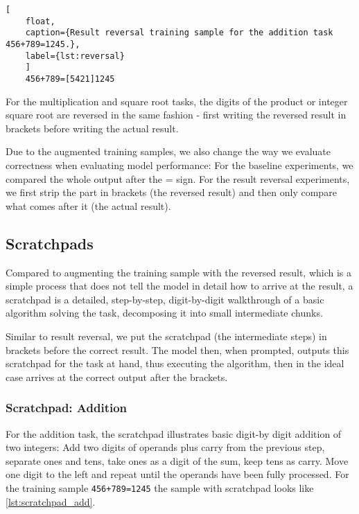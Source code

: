 \begin{lstlisting}[
	float,
	caption={Result reversal training sample for the addition task 456+789=1245.},
	label={lst:reversal}
	]
	456+789=[5421]1245
\end{lstlisting}

For the multiplication and square root tasks, the digits of the product or integer square root are reversed in the same fashion - first writing the reversed result in brackets before writing the actual result.

\noindent
Due to the augmented training samples, we also change the way we evaluate correctness when evaluating model performance: For the baseline experiments, we compared the whole output after the = sign. For the result reversal experiments, we first strip the part in brackets (the reversed result) and then only compare what comes after it (the actual result).




\FloatBarrier
\subsection{Scratchpads}
\label{methods:scratchpad}


Compared to augmenting the training sample with the reversed result, which is a simple process that does not tell the model in detail how to arrive at the result, a scratchpad is a detailed, step-by-step, digit-by-digit walkthrough of a basic algorithm solving the task, decomposing it into small intermediate chunks.

Similar to result reversal, we put the scratchpad (the intermediate steps) in brackets before the correct result. The model then, when prompted, outputs this scratchpad for the task at hand, thus executing the algorithm, then in the ideal case arrives at the correct output after the brackets.

\subsubsection{Scratchpad: Addition}
\label{add_scratchpad}

For the addition task, the scratchpad illustrates basic digit-by digit addition of two integers: Add two digits of operands plus carry from the previous step, separate ones and tens, take ones as a digit of the sum, keep tens as carry. Move one digit to the left and repeat until the operands have been fully processed. For the training sample \verb!456+789=1245! the sample with scratchpad looks like \cref{lst:scratchpad_add}.

